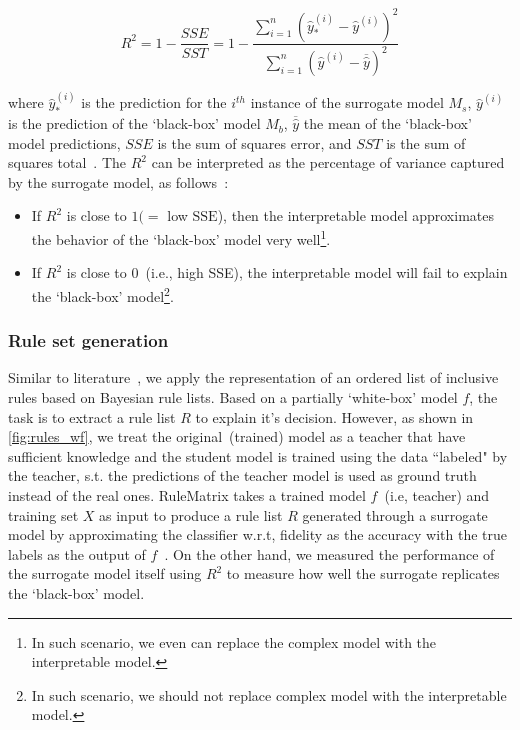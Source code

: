 \begin{equation}
    R^{2}=1-\frac{SSE}{SST}=1-\frac{\sum_{i=1}^{n}\left(\hat{y}_{*}^{(i)}-\hat{y}^{(i)}\right)^{2}}{\sum_{i=1}^{n}\left(\hat{y}^{(i)}-\overline{\hat{y}}\right)^{2}}
    \label{ew:r_squared}
\end{equation}

\hspace*{3.5mm} where $\hat{y}_{*}^{(i)}$ is the prediction for the $i^{th}$ instance of the surrogate model $M_s$, $\hat{y}^{(i)}$ is the prediction of the `black-box' model $M_b$, $\overline{\hat{y}}$ the mean of the `black-box' model predictions, $SSE$ is the sum of squares error, and $SST$ is the sum of squares total~\cite{molnar2019interpretable}. The $R^2$ can be interpreted as the percentage of variance captured by the surrogate model, as follows~\cite{molnar2019interpretable}:

\begin{itemize}[noitemsep]
    \item If $R^2$ is close to $1(=$ low $\mathrm{SSE}$), then the interpretable model approximates the behavior of the `black-box' model very well\footnote{In such scenario, we even can replace the complex model with the interpretable model.}. 
    \item If $R^2$ is close to 0~(i.e., high SSE), the interpretable model will fail to explain the `black-box' model\footnote{In such scenario, we should not replace  complex model with the interpretable model.}. 
\end{itemize}

\subsubsection{Rule set generation}
Similar to literature~\cite{ming2018rulematrix}, we apply the representation of an ordered list of inclusive rules based on Bayesian rule lists. Based on a partially `white-box' model ${f}$, the task is to extract a rule list $R$ to explain it's decision. However, as shown in \cref{fig:rules_wf}, we treat the original~(trained) model as a teacher that have sufficient knowledge and the student model is trained using the data ``labeled" by the teacher, s.t. the predictions of the teacher model is used as ground truth instead of the real ones. RuleMatrix takes a trained model ${f}$~(i.e, teacher) and training set $X$ as input to produce a rule list $R$ generated through a surrogate model by approximating the classifier  w.r.t, fidelity as the accuracy with the true labels as the output of ${f}$~\cite{ming2018rulematrix}. On the other hand, we measured the performance of the surrogate model itself using $R^2$ to measure how well the surrogate replicates the `black-box' model.    

